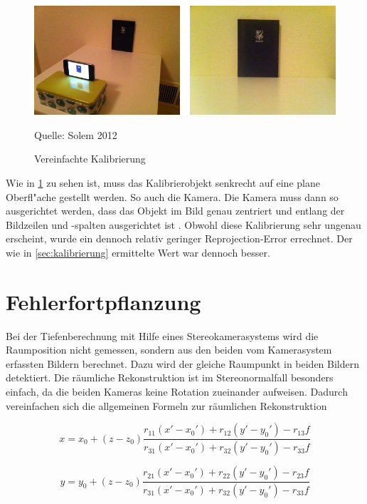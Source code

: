 \begin{figure}[H]
	\includegraphics[scale=1.0]{bilder/simple_calib}
	\caption[Vereinfachte Kalibrierung]{Vereinfachte Kalibrierung}
	\small Quelle: Solem 2012
	\label{fig:simplecalib}%
\end{figure}

\noindent Wie in \ref{fig:simplecalib} zu sehen ist, muss das Kalibrierobjekt senkrecht auf eine plane Oberfl"ache gestellt werden. So auch die Kamera. Die Kamera muss dann so ausgerichtet werden, dass das Objekt im Bild genau zentriert und entlang der Bildzeilen und -spalten ausgerichtet ist \cite{CVF}.\newline
Obwohl diese Kalibrierung sehr ungenau erscheint, wurde ein dennoch relativ geringer Reprojection-Error errechnet. Der wie in \ref{sec:kalibrierung} ermittelte Wert war dennoch besser.

\section{Fehlerfortpflanzung}
\label{sec:fehlerfortpflanzungtiefen}

Bei der Tiefenberechnung mit Hilfe eines Stereokamerasystems wird die Raumposition nicht gemessen, sondern aus den beiden vom Kamerasystem erfassten Bildern berechnet. Dazu wird der gleiche Raumpunkt in beiden Bildern detektiert. Die räumliche Rekonstruktion ist im Stereonormalfall besonders einfach, da die beiden Kameras keine Rotation zueinander aufweisen. Dadurch vereinfachen sich die allgemeinen Formeln zur räumlichen Rekonstruktion \cite{frz}

\begin{equation}
x = x_{0} + (z - z_{0})\frac
{r_{11}(x'-x_{0}') + r_{12}(y'-y_{0}')-r_{13}f}
{r_{31}(x'-x_{0}') + r_{32}(y'-y_{0}')-r_{33}f}
\end{equation}

\begin{equation}
y = y_{0} + (z - z_{0})\frac
{r_{21}(x'-x_{0}') + r_{22}(y'-y_{0}')-r_{23}f}
{r_{31}(x'-x_{0}') + r_{32}(y'-y_{0}')-r_{33}f}
\end{equation}

